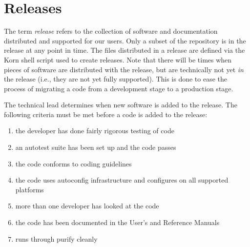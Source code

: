 \section{Releases}
\label{Releases}

The term \hypre{} {\em release} refers to the collection of software
and documentation distributed and supported for our users.  Only a
subset of the repository is in the \hypre{} release at any point in
time.  The files distributed in a release are defined via the Korn
shell script  used to create releases.  Note that
there will be times when pieces of software are distributed with the
release, but are technically not yet {\em in} the release (i.e., they
are not yet fully supported).  This is done to ease the process of
migrating a code from a development stage to a production stage.

The \hypre{} technical lead determines when new software is added to
the release.  The following criteria must be met before a code is
added to the release:
\begin{enumerate}

\item the developer has done fairly rigorous testing of code
\item an autotest suite has been set up and the code passes
\item the code conforms to coding guidelines
\item the code uses autoconfig infrastructure and configures on all
supported platforms
\item more than one developer has looked at the code
\item the code has been documented in the User's and Reference Manuals
\item runs through purify cleanly

\end{enumerate}

